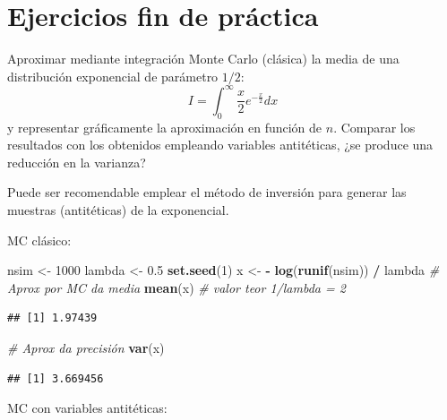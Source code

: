 \documentclass[
]{book}
\newenvironment{Shaded}{\begin{snugshade}}{\end{snugshade}}
\newcommand{\CommentTok}[1]{\textcolor[rgb]{0.56,0.35,0.01}{\textit{#1}}}
\newcommand{\DecValTok}[1]{\textcolor[rgb]{0.00,0.00,0.81}{#1}}
\newcommand{\FloatTok}[1]{\textcolor[rgb]{0.00,0.00,0.81}{#1}}
\newcommand{\KeywordTok}[1]{\textcolor[rgb]{0.13,0.29,0.53}{\textbf{#1}}}
\newcommand{\NormalTok}[1]{#1}
\newcommand{\OperatorTok}[1]{\textcolor[rgb]{0.81,0.36,0.00}{\textbf{#1}}}
\newcommand{\StringTok}[1]{\textcolor[rgb]{0.31,0.60,0.02}{#1}}
\theoremstyle{break}
\theoremstyle{definition}
\theoremstyle{definition}
\theoremstyle{definition}
\theoremstyle{remark}
\let\BeginKnitrBlock\begin \let\EndKnitrBlock\end
\begin{document}
\hypertarget{ejercicios-fin-de-pruxe1ctica}{%
\section{Ejercicios fin de práctica}\label{ejercicios-fin-de-pruxe1ctica}}

\BeginKnitrBlock{exercise}[propuesto]
\protect\hypertarget{exr:mc-int-ainv}{}{\label{exr:mc-int-ainv} {} }
\EndKnitrBlock{exercise}

Aproximar mediante integración Monte Carlo (clásica) la media de una distribución exponencial de parámetro \(1/2\):
\[I=\int_{0}^{\infty}\frac{x}{2}e^{-\frac{x}{2}}dx\]
y representar gráficamente la aproximación en función de \(n\).
Comparar los resultados con los obtenidos empleando variables antitéticas,
¿se produce una reducción en la varianza?

\BeginKnitrBlock{remark}
{}Puede ser recomendable emplear el método de inversión para generar las
muestras (antitéticas) de la exponencial.
\EndKnitrBlock{remark}

MC clásico:

\begin{Shaded}
\begin{Highlighting}[]
\NormalTok{nsim <-}\StringTok{ }\DecValTok{1000}
\NormalTok{lambda <-}\StringTok{ }\FloatTok{0.5}
\KeywordTok{set.seed}\NormalTok{(}\DecValTok{1}\NormalTok{)}
\NormalTok{x <-}\StringTok{ }\OperatorTok{-}\StringTok{ }\KeywordTok{log}\NormalTok{(}\KeywordTok{runif}\NormalTok{(nsim)) }\OperatorTok{/}\StringTok{ }\NormalTok{lambda}
\CommentTok{# Aprox por MC da media }
\KeywordTok{mean}\NormalTok{(x) }\CommentTok{# valor teor 1/lambda = 2}
\end{Highlighting}
\end{Shaded}

\begin{verbatim}
## [1] 1.97439
\end{verbatim}

\begin{Shaded}
\begin{Highlighting}[]
\CommentTok{# Aprox da precisión }
\KeywordTok{var}\NormalTok{(x)  }
\end{Highlighting}
\end{Shaded}

\begin{verbatim}
## [1] 3.669456
\end{verbatim}

MC con variables antitéticas:
\end{document}
